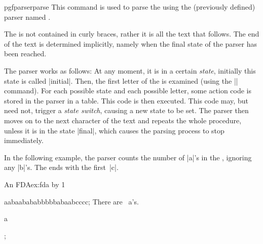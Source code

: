 \begin{docCmd}{pgfparserparse}{ }
  This command is used to parse the  using the (previously
  defined) parser named .

  The  is not contained in curly braces, rather it is all
  the text that follows. The end of the text is determined implicitly,
  namely when the final state of the parser has been reached.

  The parser works as follows: At any moment, it is in a certain
  \emph{state}, initially this state is called |initial|. Then, the
  first letter of the  is examined (using the |\futurlet|
  command). For each possible state and each possible letter, some
  action code is stored in the parser in a table. This code is then
  executed. This code may, but need not, trigger a \emph{state
    switch}, causing a new state to be set. The parser then moves on
  to the next character of the text and repeats the whole
  procedure, unless it is in the state |final|, which causes the
  parsing process to stop immediately.

  In the following example, the parser counts the number of |a|'s
  in the , ignoring any |b|'s. The  ends with
  the first~|c|.
\begin{texexample}{An FDA}{ex:fda}
\newcount\mycount
{}
{\advance\mycount by 1\relax}
{} %
{}
{}%

aabaabababbbbbabaabcccc;
There are \the\mycount\ a's.

\meaning a

\meaning ;
\end{texexample}
\end{docCmd}

